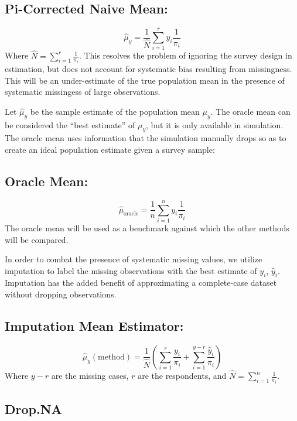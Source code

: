 \documentclass[12pt,twoside]{reedthesis}
\begin{document}
\subsection{Pi-Corrected Naive Mean:}\label{pi-corrected-naive-mean}

\[
\hat \mu_y = \frac{1}{\hat N} \sum_{i=1}^r y_i \frac{1}{\pi_i}
\] Where \(\hat N = \sum_{i=1}^r \frac{1}{\pi_i}\). This resolves the
problem of ignoring the survey design in estimation, but does not
account for systematic bias resulting from missingness. This will be an
under-estimate of the true population mean in the presence of systematic
missingess of large observations.

Let \(\hat \mu_y\) be the sample estimate of the population mean
\(\mu_y\). The oracle mean can be considered the ``best estimate'' of
\(\mu_y\), but it is only available in simulation. The oracle mean uses
information that the simulation manually drops so as to create an ideal
population estimate given a survey sample:

\subsection{Oracle Mean:}\label{oracle-mean}

\[
\hat \mu_{\text{oracle}} = \frac{1}{n} \sum_{i=1}^n y_i \frac{1}{\pi_i}
\] The oracle mean will be used as a benchmark against which the other
methods will be compared.

In order to combat the presence of systematic missing values, we utilize
imputation to label the missing observations with the best estimate of
\(y_i\), \(\hat y_i\). Imputation has the added benefit of approximating
a complete-case dataset without dropping observations.

\subsection{Imputation Mean Estimator:}\label{imputation-mean-estimator}

\[
\hat \mu_y(\text{method}) = \frac{1}{\hat N} (\sum_{i=1}^{r} \frac{y_i}{\pi_i} + \sum_{i=1}^{y-r} \frac{\hat y_i}{\pi_i})
\] Where \(y-r\) are the missing cases, \(r\) are the respondents, and
\(\hat N = \sum_{i=1}^n \frac{1}{\pi_i}\).

\subsection{Drop.NA}\label{drop.na}
\end{document}
